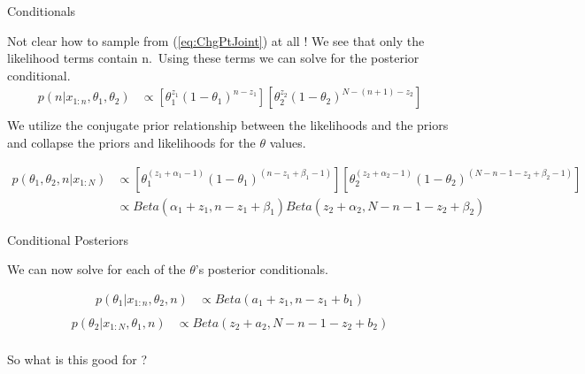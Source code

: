 \documentclass[
  ignorenonframetext,
]{beamer}
\begin{document}
\begin{frame}{Conditionals}
\protect\hypertarget{conditionals}{}

\footnotesize

Not clear how to sample from (\ref{eq:ChgPtJoint}) at all ! We see that
only the likelihood terms contain n.~Using these terms we can solve for
the posterior conditional. \begin{equation}
\begin{aligned}
p(n| x_{1:n}, \theta_{1}, \theta_{2}) &\propto  [\theta_{1}^{z_{1}}(1-\theta_{1})^{n-z_{1}}]
  [\theta_{2}^{z_{2}}(1-\theta_{2})^{N-(n+1)-z_{2}}]\\
\end{aligned}
\end{equation} We utilize the conjugate prior relationship between the
likelihoods and the priors and collapse the priors and likelihoods for
the \(\theta\) values.

\begin{equation}
\begin{aligned}
p(\theta_{1}, \theta_{2}, n| x_{1:N}) &\propto            
  [\theta_{1}^{(z_{1}+\alpha_{1}-1)}(1-\theta_{1})^{(n-z_{1}+\beta_{1}-1)}]
  [\theta_{2}^{(z_{2}+\alpha_{2}-1)}(1-\theta_{2})^{(N-n-1-z_{2}+\beta_{2}-1)}]\\
&\propto Beta(\alpha_{1}+z_{1}, n-z_{1}+\beta_{1}) Beta(z_{2}+\alpha_{2}, N-n-1-z_{2}+\beta_{2})
\end{aligned}
\end{equation}

\end{frame}

\begin{frame}{Conditional Posteriors}
\protect\hypertarget{conditional-posteriors}{}

\footnotesize

We can now solve for each of the \(\theta\)'s posterior conditionals.

\begin{equation}
\begin{aligned}
p(\theta_{1}| x_{1:n},\theta_{2}, n) &\propto Beta(a_{1}+z_{1}, n-z_{1}+b_{1})\\
\end{aligned}
\end{equation} \begin{equation}
\begin{aligned}
p(\theta_{2}| x_{1:N},\theta_{1}, n) &\propto Beta(z_{2}+a_{2}, N-n-1-z_{2}+b_{2})\\
\end{aligned}
\end{equation}

So what is this good for ?

\end{frame}
\end{document}
